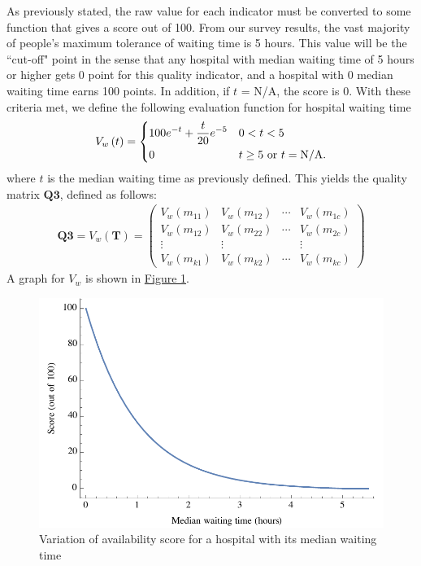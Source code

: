 \documentclass{article}
\newcommand{\MRef}[2]{\hyperref[#2]{#1 \ref*{#2}}}
\begin{document}
As previously stated, the raw value for each indicator must be converted to some function that gives a score out of 100. From our survey results, the vast majority of people's maximum tolerance of waiting time is 5 hours. This value will be the ``cut-off" point in the sense that any hospital with median waiting time of 5 hours or higher gets 0 point for this quality indicator, and a hospital with 0 median waiting time earns 100 points. In addition, if $t$ = N/A, the score is 0. With these criteria met, we define the following evaluation function for hospital waiting time
\begin{gather}
V_w\left(t\right) =
\begin{dcases}
    100e^{-t} + \frac{t}{20}e^{-5} & 0 < t < 5\\
    0 & t \ge 5 \text{ or } t = \text{N/A}.
\end{dcases}
\end{gather}
where $t$ is the median waiting time as previously defined. This yields the quality matrix $\mathbf{Q3}$, defined as follows:
\begin{gather}
    \mathbf{Q3} = V_w\left(\mathbf{T}\right) =
    \begin{pmatrix}
    V_w\left(m_{11}\right) & V_w\left(m_{12}\right) & \cdots & V_w\left(m_{1c}\right)\\
    V_w\left(m_{12}\right) & V_w\left(m_{22}\right) & \cdots & V_w\left(m_{2c}\right)\\
    \vdots & \vdots & & \vdots\\
    V_w\left(m_{k1}\right) & V_w\left(m_{k2}\right) & \cdots & V_w\left(m_{kc}\right)
    \end{pmatrix}
\end{gather}
A graph for $V_w$ is shown in \MRef{Figure}{fig:v_w}.

\begin{figure}[htbp]
    \centering
    \includegraphics[scale=0.75]{V_w.pdf}
    \caption{Variation of availability score for a hospital with its median waiting time}
    \label{fig:v_w}
\end{figure}
\end{document}
